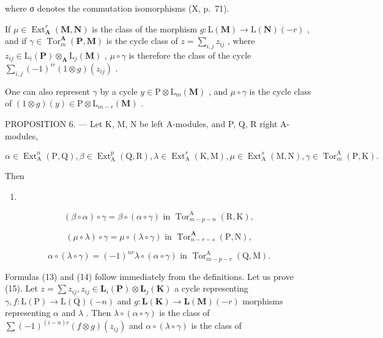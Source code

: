 where σ denotes the commutation isomorphisms (X, p.~71).

If \(\mu \in \operatorname{Ext}_{\mathbf{A}}^{r}(\mathbf{M}, \mathbf{N})\) is the class of the morphism \(g: \mathrm{L}(\mathbf{M}) \to \mathrm{L}(\mathbf{N})(-r)\) , and if \(\gamma \in \operatorname{Tor}_{m}^{\mathbf{A}}(\mathbf{P}, \mathbf{M})\) is the cycle class of \(z = \sum_{i,j} z_{ij}\) , where \(z_{ij} \in \mathrm{L}_i(\mathbf{P}) \otimes_{\mathbf{A}} \mathrm{L}_j(\mathbf{M})\) , \(\mu \circ \gamma\) is therefore the class of the cycle \(\sum_{i,j} (-1)^{ir}(1 \otimes g)(z_{ij})\) .

One can also represent \(\gamma\) by a cycle \(y \in \mathrm{P} \otimes \mathrm{L}_{m}(\mathbf{M})\) , and \(\mu \circ \gamma\) is the cycle class of \((1 \otimes g)(y) \in \mathrm{P} \otimes \mathrm{L}_{m-r}(\mathbf{M})\) .

PROPOSITION 6. --- Let K, M, N be left A-modules, and P, Q, R right A-modules,

\[
\alpha \in \operatorname{Ext} _ {\mathrm{A}} ^ {n} (\mathrm{P}, \mathrm{Q}), \beta \in \operatorname{Ext} _ {\mathrm{A}} ^ {p} (\mathrm{Q}, \mathrm{R}), \lambda \in \operatorname{Ext} _ {\mathrm{A}} ^ {r} (\mathrm{K}, \mathrm{M}), \mu \in \operatorname{Ext} _ {\mathrm{A}} ^ {s} (\mathrm{M}, \mathrm{N}), \gamma \in \operatorname{Tor} _ {m} ^ {\mathrm{A}} (\mathrm{P}, \mathrm{K}).
\]

Then

\begin{enumerate}
\def\labelenumi{(\arabic{enumi})}
\setcounter{enumi}{12}
\tightlist
\item
\end{enumerate}

\[
(\beta \circ \alpha) \circ \gamma = \beta \circ (\alpha \circ \gamma) \text { in }\operatorname{Tor} _ {m - p - n} ^ {\mathrm{A}} (\mathrm{R}, \mathrm{K}),\tag{14}
\]

\[
(\mu \circ \lambda) \circ \gamma = \mu \circ (\lambda \circ \gamma) \text { in }\operatorname{Tor} _ {n - r - s} ^ {\mathbf {A}} (\mathrm{P}, \mathrm{N}),\tag{15}
\]

\[
\alpha \circ (\lambda \circ \gamma) = (- 1) ^ {n r} \lambda \circ (\alpha \circ \gamma) \text { in }\operatorname{Tor} _ {m - p - r} ^ {\mathrm{A}} (\mathrm{Q}, \mathrm{M}).
\]

Formulas (13) and (14) follow immediately from the definitions. Let us prove (15). Let \(z = \sum z_{ij}, z_{ij} \in \mathbf{L}_i(\mathbf{P}) \otimes \mathbf{L}_j(\mathbf{K})\) a cycle representing \(\gamma, f: \mathrm{L}(\mathrm{P}) \to \mathrm{L}(\mathrm{Q})(-n)\) and \(g: \mathbf{L}(\mathbf{K}) \to \mathbf{L}(\mathbf{M})(-r)\) morphisms representing \(\alpha\) and \(\lambda\) . Then \(\lambda \circ (\alpha \circ \gamma)\) is the class of \(\sum (-1)^{(i-n)r}(f \otimes g)(z_{ij})\) and \(\alpha \circ (\lambda \circ \gamma)\) is the class of

